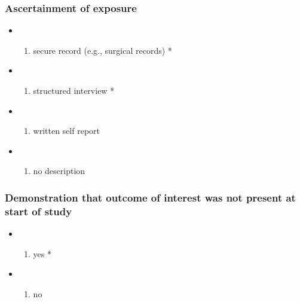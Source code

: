 \documentclass[
  doc, a4paper]{apa7}
\providecommand{\tightlist}{%
  \setlength{\itemsep}{0pt}\setlength{\parskip}{0pt}}
\begin{document}
\subsubsection{Ascertainment of exposure}\label{ascertainment-of-exposure-1}

\begin{itemize}
\tightlist
\item
  \begin{enumerate}
  \def\labelenumi{\alph{enumi})}
  \tightlist
  \item
    secure record (e.g., surgical records) *
  \end{enumerate}
\item
  \begin{enumerate}
  \def\labelenumi{\alph{enumi})}
  \setcounter{enumi}{1}
  \tightlist
  \item
    structured interview *
  \end{enumerate}
\item
  \begin{enumerate}
  \def\labelenumi{\alph{enumi})}
  \setcounter{enumi}{2}
  \tightlist
  \item
    written self report
  \end{enumerate}
\item
  \begin{enumerate}
  \def\labelenumi{\alph{enumi})}
  \setcounter{enumi}{3}
  \tightlist
  \item
    no description
  \end{enumerate}
\end{itemize}

\subsubsection{Demonstration that outcome of interest was not present at start of study}\label{demonstration-that-outcome-of-interest-was-not-present-at-start-of-study}

\begin{itemize}
\tightlist
\item
  \begin{enumerate}
  \def\labelenumi{\alph{enumi})}
  \tightlist
  \item
    yes *
  \end{enumerate}
\item
  \begin{enumerate}
  \def\labelenumi{\alph{enumi})}
  \setcounter{enumi}{1}
  \tightlist
  \item
    no
  \end{enumerate}
\end{itemize}
\end{document}
